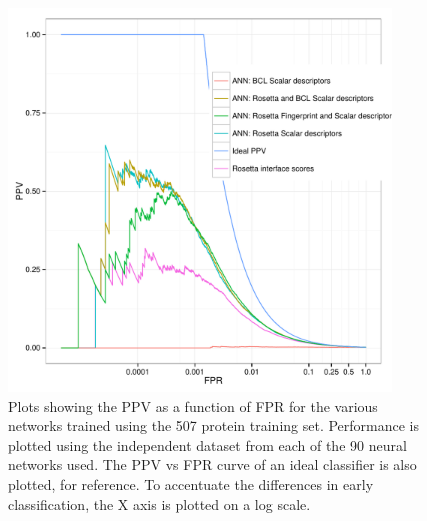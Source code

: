 \begin{figure}
\centering
\includegraphics[width=4in]{figures/hts/ppv_plot.pdf}
\caption{
Plots showing the \acs{PPV} as a function of \acs{FPR} for the various networks trained using the 507 protein training set.
Performance is plotted using the independent dataset from each of the 90 neural networks used.
The \acs{PPV} vs \acs{FPR} curve of an ideal classifier is also plotted, for reference.
To accentuate the differences in early classification, the X axis is plotted on a log scale.
}
\label{fig:ppv_plot}
\end{figure}


